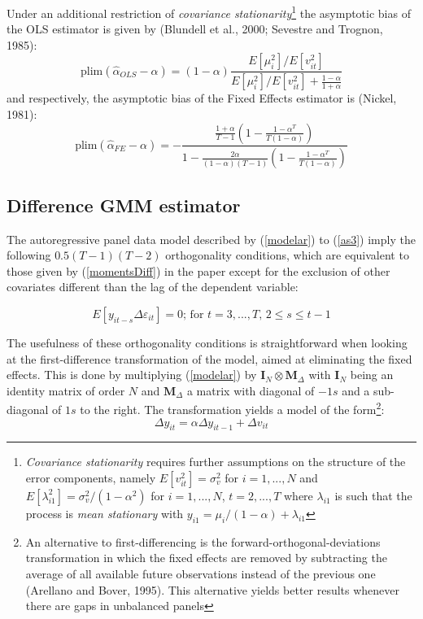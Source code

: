 \documentclass[12pt,a4paper,english]{article}%
\begin{document}
Under an additional restriction of \emph{covariance stationarity}\footnote{\emph{Covariance stationarity} requires further assumptions on the structure of the error components, namely $E[v_{it}^2]=\sigma_v^2$ for $i=1,...,N$ and $E[\lambda_{i1}^2]=\sigma_v^2 / (1-\alpha^2)$ for $i=1,...,N$, $t=2,...,T$ where $\lambda_{i1}$ is such that the process is \emph{mean stationary} with $y_{i1}=\mu_{i}/(1-\alpha)+\lambda_{i1}$} the asymptotic bias of the OLS estimator is given by (Blundell et al., 2000; Sevestre and Trognon, 1985):
\[
\text{plim}\left(\hat\alpha_{OLS}-\alpha \right) =\left(1-\alpha\right)\frac{E[\mu_i^2]/E[v_{it}^2]}{E[\mu_i^2]/E[v_{it}^2]+\frac{1-\alpha}{1+\alpha}}
\]
and respectively, the asymptotic bias of the Fixed Effects estimator is (Nickel, 1981):
\[
\text{plim}\left(\hat\alpha_{FE}-\alpha \right)=-\frac{\frac{1+\alpha}{T-1}\left(1-\frac{1-\alpha^T}{T(1-\alpha)}\right)}{1-\frac{2\alpha}{(1-\alpha)(T-1)}\left(1-\frac{1-\alpha^T}{T(1-\alpha)}\right)}
\]

\subsection*{Difference GMM estimator}

The autoregressive panel data model described by (\ref{modelar}) to (\ref{as3}) imply the following $0.5(T-1)(T-2)$ orthogonality conditions, which are equivalent to those given by (\ref{momentsDiff}) in the paper except for the exclusion of other covariates different than the lag of the dependent variable:

\begin{equation}
\label{momentsDiffAp}
\tag{5'}
E\left[ y_{it-s}\Delta \varepsilon_{it}\right]=0 \text{; for $t=3,...,T$, $2\leq s \leq t-1$}
\end{equation}

The usefulness of these orthogonality conditions is straightforward when looking at the first-difference transformation of the model, aimed at eliminating the fixed effects. This is done by multiplying (\ref{modelar}) by $\mathbf{I}_N \otimes \mathbf{M}_{\Delta}$ with $\mathbf{I}_N$ being an identity matrix of order $N$ and $\mathbf{M}_{\Delta}$ a matrix with diagonal of $-1s$ and a sub-diagonal of $1s$ to the right. The transformation yields a model of the form\footnote{An alternative to first-differencing is the forward-orthogonal-deviations transformation in which the fixed effects are removed by subtracting the average of all available future observations instead of the previous one (Arellano and Bover, 1995). This alternative yields better results whenever there are gaps in unbalanced panels}:
\[
\Delta y_{it}=\alpha \Delta y_{it-1} +\Delta v_{it}
\]
\end{document}
